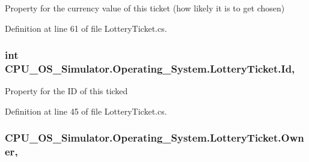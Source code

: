 Property for the currency value of this ticket (how likely it is to get chosen) 



Definition at line 61 of file Lottery\+Ticket.\+cs.

\hypertarget{class_c_p_u___o_s___simulator_1_1_operating___system_1_1_lottery_ticket_a36be2545d1ee5498d1c309a5a39ec181}{}
\subsubsection[{Id}]{\setlength{\rightskip}{0pt plus 5cm}int C\+P\+U\+\_\+\+O\+S\+\_\+\+Simulator.\+Operating\+\_\+\+System.\+Lottery\+Ticket.\+Id\hspace{0.3cm}{\ttfamily [get]}, {\ttfamily [set]}}\label{class_c_p_u___o_s___simulator_1_1_operating___system_1_1_lottery_ticket_a36be2545d1ee5498d1c309a5a39ec181}


Property for the I\+D of this ticked 



Definition at line 45 of file Lottery\+Ticket.\+cs.

\hypertarget{class_c_p_u___o_s___simulator_1_1_operating___system_1_1_lottery_ticket_ab500b400dea7b986bad4dd13c376f9d2}{}
\subsubsection[{Owner}]{ C\+P\+U\+\_\+\+O\+S\+\_\+\+Simulator.\+Operating\+\_\+\+System.\+Lottery\+Ticket.\+Owner\hspace{0.3cm}{\ttfamily [get]}, {\ttfamily [set]}}\label{class_c_p_u___o_s___simulator_1_1_operating___system_1_1_lottery_ticket_ab500b400dea7b986bad4dd13c376f9d2}


